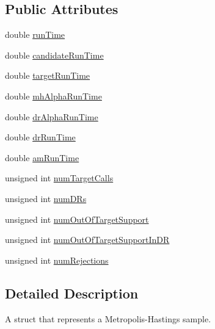 \subsection*{Public Attributes}
\begin{DoxyCompactItemize}
\item 
double \hyperlink{struct_q_u_e_s_o_1_1_m_h_raw_chain_info_struct_a5b36b9734f0b40d54cfd4c58c18c9b45}{run\-Time}
\item 
double \hyperlink{struct_q_u_e_s_o_1_1_m_h_raw_chain_info_struct_ada3a9649c975062a366df63561c599c7}{candidate\-Run\-Time}
\item 
double \hyperlink{struct_q_u_e_s_o_1_1_m_h_raw_chain_info_struct_ab230db8f99e46f0c1e4fc6c2aa3773eb}{target\-Run\-Time}
\item 
double \hyperlink{struct_q_u_e_s_o_1_1_m_h_raw_chain_info_struct_a16d5d703c764352dfe30dfaa25ce8b8b}{mh\-Alpha\-Run\-Time}
\item 
double \hyperlink{struct_q_u_e_s_o_1_1_m_h_raw_chain_info_struct_afa74a9d74fc3e7942012b8d8448f6687}{dr\-Alpha\-Run\-Time}
\item 
double \hyperlink{struct_q_u_e_s_o_1_1_m_h_raw_chain_info_struct_acd15a61993f122a3780dfae6f096d9b9}{dr\-Run\-Time}
\item 
double \hyperlink{struct_q_u_e_s_o_1_1_m_h_raw_chain_info_struct_a0ea7cbad553a5f79c1e1c89b25bc8cde}{am\-Run\-Time}
\item 
unsigned int \hyperlink{struct_q_u_e_s_o_1_1_m_h_raw_chain_info_struct_a506e08bdffc1f777e33c7ec2d7862747}{num\-Target\-Calls}
\item 
unsigned int \hyperlink{struct_q_u_e_s_o_1_1_m_h_raw_chain_info_struct_a993b070bd796dd176f4168be05f11ce9}{num\-D\-Rs}
\item 
unsigned int \hyperlink{struct_q_u_e_s_o_1_1_m_h_raw_chain_info_struct_a601f798ee4dc28cfa6b342fc04a8c841}{num\-Out\-Of\-Target\-Support}
\item 
unsigned int \hyperlink{struct_q_u_e_s_o_1_1_m_h_raw_chain_info_struct_a783bb6c6b6dcab7f2bcc9fd0f49c588f}{num\-Out\-Of\-Target\-Support\-In\-D\-R}
\item 
unsigned int \hyperlink{struct_q_u_e_s_o_1_1_m_h_raw_chain_info_struct_a276f608de19910713df01124a971c79c}{num\-Rejections}
\end{DoxyCompactItemize}


\subsection{Detailed Description}
A struct that represents a Metropolis-\/\-Hastings sample. 


